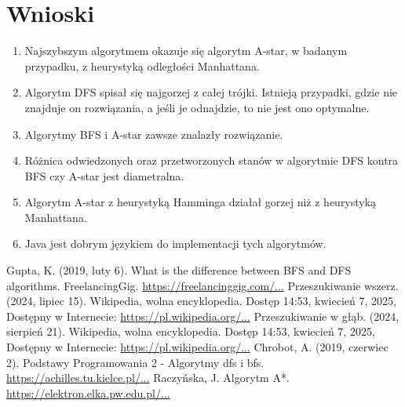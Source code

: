 \documentclass{classrep}
\begin{document}
    \section{Wnioski}\label{sec:wnioski}
    \begin{enumerate}
        \item Najszybszym algorytmem okazuje się algorytm A-star, w badanym przypadku, z heurystyką odległości Manhattana.
        \item Algorytm DFS spisał się najgorzej z całej trójki.
        Istnieją przypadki, gdzie nie znajduje on rozwiązania, a jeśli je odnajdzie, to nie jest ono optymalne.
        \item Algorytmy BFS i A-star zawsze znalazły rozwiązanie.
        \item Różnica odwiedzonych oraz przetworzonych stanów w algorytmie DFS kontra BFS czy A-star jest diametralna.
        \item Algorytm A-star z heurystyką Hamminga działał gorzej niż z heurystyką Manhattana.
        \item Java jest dobrym językiem do implementacji tych algorytmów.
    \end{enumerate}

    \clearpage

    \begin{thebibliography}{0}
         Gupta, K. (2019, luty 6). What is the difference between BFS and DFS algorithms. FreelancingGig.
        \href{https://www.freelancinggig.com/blog/2019/02/06/what-is-the-difference-between-bfs-and-dfs-algorithms/}{https://freelancinggig.com/...}
         Przeszukiwanie wszerz. (2024, lipiec 15). Wikipedia, wolna encyklopedia. Dostęp 14:53, kwiecień 7, 2025,
        Dostępny w Internecie: \href{https://www.pl.wikipedia.org/w/index.php?title=Przeszukiwanie_wszerz&oldid=74276741}{https://pl.wikipedia.org/...}
         Przeszukiwanie w głąb. (2024, sierpień 21). Wikipedia, wolna encyklopedia. Dostęp 14:53, kwiecień 7, 2025,
        Dostępny w Internecie: \href{https://www.pl.wikipedia.org/w/index.php?title=Przeszukiwanie\_w\_g%C5%82%C4%85b&oldid=74583679}{https://pl.wikipedia.org/...}
         Chrobot, A. (2019, czerwiec 2). Podstawy Programowania 2 - Algorytmy dfs i bfs. \href{https://achilles.tu.kielce.pl/portal/Members/84df831b59534bdc88bef09b15e73c99/archive/semestr-ii-2018-2019/pdf/pp2/lecture/pp2_lecture_13.pdf}{https://achilles.tu.kielce.pl/...}
         Raczyńska, J. Algorytm A*. \href{https://elektron.elka.pw.edu.pl/~jarabas/ALHE/notatki3.pdf}{https://elektron.elka.pw.edu.pl/...}
    \end{thebibliography}
\end{document}
